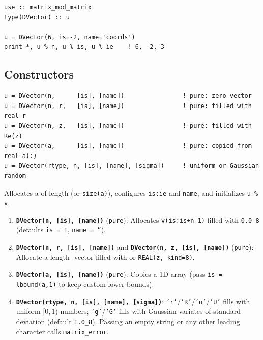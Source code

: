 \lstset{language=[95]Fortran}
\begin{lstlisting}
use :: matrix_mod_matrix
type(DVector) :: u

u = DVector(6, is=-2, name='coords')
print *, u % n, u % is, u % ie    ! 6, -2, 3
\end{lstlisting}

\subsection{Constructors}
\label{subsec:dvec_constructors}


\lstset{language=[95]Fortran}
\begin{lstlisting}
u = DVector(n,      [is], [name])                ! pure: zero vector
u = DVector(n, r,   [is], [name])                ! pure: filled with real r
u = DVector(n, z,   [is], [name])                ! pure: filled with Re(z)
u = DVector(a,      [is], [name])                ! pure: copied from real a(:)
u = DVector(rtype, n, [is], [name], [sigma])     ! uniform or Gaussian random
\end{lstlisting}

Allocates a  of length  (or \texttt{size(a)}), configures \texttt{is:ie} and \texttt{name}, and initializes \texttt{u \% v}.

\begin{enumerate}
  \item \textbf{\texttt{DVector(n, [is], [name])}} (\texttt{pure}): Allocates \texttt{v(is:is+n-1)} filled with \texttt{0.0\_8} (defaults \texttt{is = 1}, \texttt{name = ''}).
  \item \textbf{\texttt{DVector(n, r, [is], [name])}} and \textbf{\texttt{DVector(n, z, [is], [name])}} (\texttt{pure}): Allocate a length- vector filled with  or \texttt{REAL(z, kind=8)}.
  \item \textbf{\texttt{DVector(a, [is], [name])}} (\texttt{pure}): Copies a 1D  array  (pass \texttt{is = lbound(a,1)} to keep custom lower bounds).
  \item \textbf{\texttt{DVector(rtype, n, [is], [name], [sigma])}}: \texttt{'r'}/\texttt{'R'}/\texttt{'u'}/\texttt{'U'} fills with uniform $[0,1)$ numbers; \texttt{'g'}/\texttt{'G'} fills with Gaussian variates of standard deviation  (default \texttt{1.0\_8}). Passing an empty string or any other leading character calls \texttt{matrix\_error}.
\end{enumerate}

